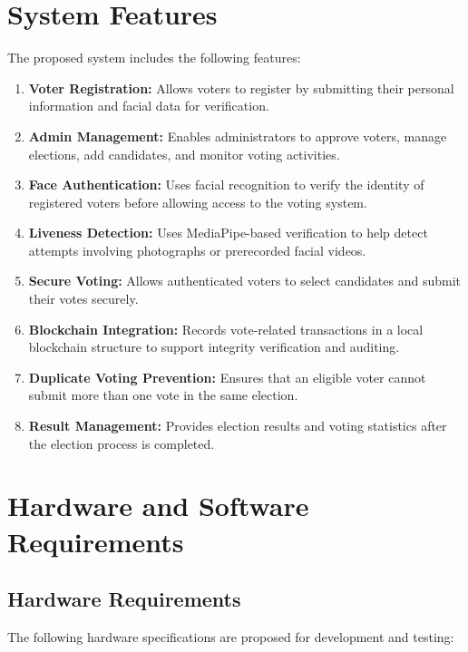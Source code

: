 \documentclass[12pt]{report}
\begin{document}
	\section{System Features}
	The proposed system includes the following features:
	\begin{enumerate}
		\item \textbf{Voter Registration:} Allows voters to register by submitting their personal information and facial data for verification.
		\item \textbf{Admin Management:} Enables administrators to approve voters, manage elections, add candidates, and monitor voting activities.
		\item \textbf{Face Authentication:} Uses facial recognition to verify the identity of registered voters before allowing access to the voting system.
		\item \textbf{Liveness Detection:} Uses MediaPipe-based verification to help detect attempts involving photographs or prerecorded facial videos.
		\item \textbf{Secure Voting:} Allows authenticated voters to select candidates and submit their votes securely.
		\item \textbf{Blockchain Integration:} Records vote-related transactions in a local blockchain structure to support integrity verification and auditing.
		\item \textbf{Duplicate Voting Prevention:} Ensures that an eligible voter cannot submit more than one vote in the same election.
		\item \textbf{Result Management:} Provides election results and voting statistics after the election process is completed.
	\end{enumerate}
	
	\section{Hardware and Software Requirements}
	
	\subsection{Hardware Requirements}
	The following hardware specifications are proposed for development and testing:
	
\end{document}
